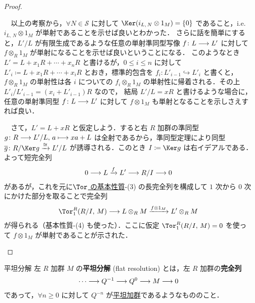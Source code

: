 \documentclass[algtopo_main]{subfiles}
\begin{document}
\begin{proof}
\begin{description}
        　以上の考察から，$\forall N \in \mathcal{S}$ に対して $\Ker (i_{L,\, N} \otimes 1_M) = \{0\}$ であること，i.e. $i_{L,\, N} \otimes 1_M$ が単射であることを示せば良いとわかった．
        さらに話を簡単にすると，$L'/L$ が有限生成であるような任意の単射準同型写像 $f \colon L \longrightarrow L'$ に対して $f \otimes_R 1_M$ が単射になることを示せば良いということになる．
        このようなとき $L' = L + x_1 R + \cdots + x_n R$ と書けるが，$0 \le i \le n$ に対して $L'_i \coloneqq L + x_1 R + \cdots + x_i R$ とおき，標準的包含を $f_{i} \colon L'_{i-1} \hookrightarrow L'_{i}$ と書くと，$f \otimes_R 1_M$ の単射性は各 $i$ についての $f_i \otimes_R 1_M$ の単射性に帰着される．その上 $L'_i / L'_{i-1} = (x_i + L'_{i-1}) R$ なので，
        結局 $L'/L = xR$ と書けるような場合に，任意の単射準同型 $f \colon L \longrightarrow L'$ に対して $f \otimes 1_M$ も単射となることを示しさえすれば良い．

        　さて，$L' = L + xR$ と仮定しよう．すると右 $R$ 加群の準同型 $g \colon R \longrightarrow L'/L,\, a \longmapsto xa + L$ は全射であるから，準同型定理により同型 $\overline{g} \colon R/\Ker g \xrightarrow{\cong} L'/L$ が誘導される．このとき $I \coloneqq \Ker g$ は右イデアルである．
        よって短完全列
        \begin{align}
            0 \longrightarrow L \xrightarrow{f} L' \longrightarrow R/I \longrightarrow 0
        \end{align}
        があるが，これを元に\hyperref[prop:Tor-basic]{$\Tor$ の基本性質}-(3) の長完全列を構成して $1$ 次から $0$ 次にかけた部分を取ることで完全列
        \begin{align}
            \Tor_1^R(R/I,\, M) \lto L \otimes_R M \xrightarrow{f \otimes 1_M} L'\otimes_R M
        \end{align}
        が得られる（基本性質-(4) も使った）．ここに仮定 $\Tor_1^R(R/I,\, M) = 0$ を使って $f \otimes 1_M$ が単射であることが示された．
    \end{description}
    
\end{proof}

\begin{mydef}[label=def:flat-resolution]{平坦分解}
    左 $R$ 加群 $M$ の\textbf{平坦分解} (flat resolution) とは，左 $R$ 加群の\textbf{完全列}
    \begin{align}
        \cdots \longrightarrow Q^{-1} \longrightarrow Q^0 \longrightarrow M \longrightarrow 0 
    \end{align}
    であって，$\forall n \ge 0$ に対して $Q^{-n}$ が\hyperref[def:flat-mod]{平坦加群}であるようなもののこと．
\end{mydef}
\end{document}
